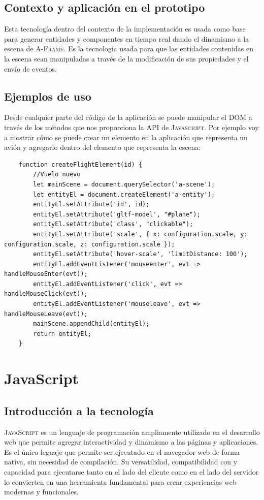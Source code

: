 \documentclass[a4paper, 11pt]{book}
\begin{document}
\subsection{Contexto y aplicación en el prototipo}
Esta tecnología dentro del contexto de la implementación es usada como base para generar entidades y componentes en tiempo real dando el dinamismo a la escena de \textsc{A-Frame}. Es la tecnología usada para que las entidades contenidas en la escena sean manipuladas a través de la modificación de sus propiedades y el envío de eventos.
\subsection{Ejemplos de uso}
Desde cualquier parte del código de la aplicación se puede manipular el \textsc{DOM} a través de los métodos que nos proporciona la \textsc{\gls{API}} de \textsc{Javascript}. Por ejemplo voy a mostrar cómo se puede crear un elemento en la aplicación que representa un avión y agregarlo dentro del elemento que representa la escena:
\begin{verbatim}
	function createFlightElement(id) {
		//Vuelo nuevo
		let mainScene = document.querySelector('a-scene');
		let entityEl = document.createElement('a-entity');
		entityEl.setAttribute('id', id);
		entityEl.setAttribute('gltf-model', "#plane");
		entityEl.setAttribute('class', "clickable");
		entityEl.setAttribute('scale', { x: configuration.scale, y: configuration.scale, z: configuration.scale });
		entityEl.setAttribute('hover-scale', 'limitDistance: 100');
		entityEl.addEventListener('mouseenter', evt => handleMouseEnter(evt));
		entityEl.addEventListener('click', evt => handleMouseClick(evt));
		entityEl.addEventListener('mouseleave', evt => handleMouseLeave(evt));
		mainScene.appendChild(entityEl);
		return entityEl;
	}
\end{verbatim}
\section{JavaScript}
\label{sec:javascript}
\subsection{Introducción a la tecnología}
\textsc{JavaScript} es un lenguaje de programación ampliamente utilizado en el desarrollo web que permite agregar interactividad y dinamismo a las páginas y aplicaciones. Es el único leguaje que permite ser ejecutado en el navegador web de forma nativa, sin necesidad de compilación. Su versatilidad, compatibilidad con \emph{} y capacidad para ejecutarse tanto en el lado del cliente como en el lado del servidor lo convierten en una herramienta fundamental para crear experiencias web modernas y funcionales.
\end{document}
